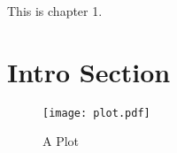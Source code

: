 \documentclass[../report.tex]{subfiles}
\begin{document}
This is chapter 1.
\section{Intro Section}

\begin{figure}
    \texttt{[image: plot.pdf]} %
    \caption{A Plot}
\end{figure}
\end{document}
